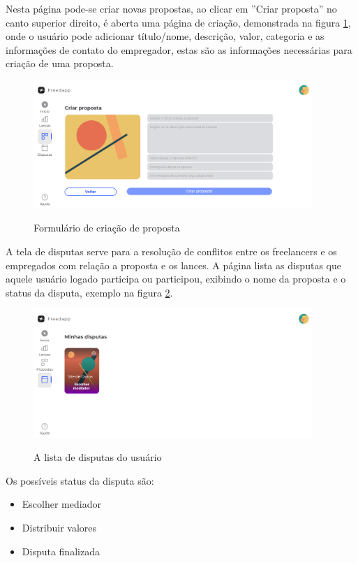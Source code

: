 Nesta página pode-se criar novas propostas, ao clicar em ''Criar proposta'' no canto superior direito, é aberta uma página de criação, demonstrada na figura \ref{fig:proposal_create_fig}, onde o usuário pode adicionar título/nome, descrição, valor, categoria e as informações de contato do empregador, estas são as informações necessárias para criação de uma proposta.

\begin{figure}[!h]
  \centering
  \caption{Formulário de criação de proposta}
  \includegraphics[width=400px]{src/images/app/proposal_create.PNG}
  \label{fig:proposal_create_fig}
\end{figure}

A tela de disputas serve para a resolução de conflitos entre os freelancers e os empregados com relação a proposta e os lances. A página lista as disputas que aquele usuário logado participa ou participou, exibindo o nome da proposta e o status da disputa, exemplo na figura \ref{fig:dispute_list_fig}.

\begin{figure}[!h]
  \centering
  \caption{A lista de disputas do usuário}
  \includegraphics[width=400px]{src/images/app/dispute_list.PNG}
  \label{fig:dispute_list_fig}
\end{figure}

Os possíveis status da disputa são:
\begin{itemize}
    \item Escolher mediador
    \item Distribuir valores
    \item Disputa finalizada
\end{itemize}


